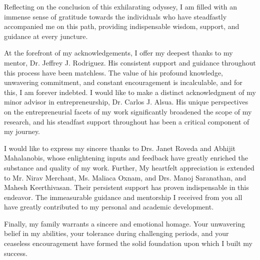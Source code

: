 Reflecting on the conclusion of this exhilarating odyssey, I am filled with an immense sense of gratitude towards the individuals who have steadfastly accompanied me on this path, providing indispensable wisdom, support, and guidance at every juncture.

At the forefront of my acknowledgements, I offer my deepest thanks to my mentor, Dr\@. Jeffrey J\@. Rodriguez. His consistent support and guidance throughout this process have been matchless. The value of his profound knowledge, unwavering commitment, and constant encouragement is incalculable, and for this, I am forever indebted. I would like to make a distinct acknowledgment of my minor advisor in entrepreneurship, Dr\@. Carlos J\@. Alsua. His unique perspectives on the entrepreneurial facets of my work significantly broadened the scope of my research, and his steadfast support throughout has been a critical component of my journey.


I would like to express my sincere thanks to Drs\@. Janet Roveda and Abhijit Mahalanobis, whose enlightening inputs and feedback have greatly enriched the substance and quality of my work. Further, My heartfelt appreciation is extended to Mr\@. Nirav Merchant, Ms\@. Maliaca Oxnam, and Drs\@. Manoj Saranathan, and Mahesh Keerthivasan. Their persistent support has proven indispensable in this endeavor. The immeasurable guidance and mentorship I received from you all have greatly contributed to my personal and academic development.

Finally, my family warrants a sincere and emotional homage. Your unwavering belief in my abilities, your tolerance during challenging periods, and your ceaseless encouragement have formed the solid foundation upon which I built my success.

